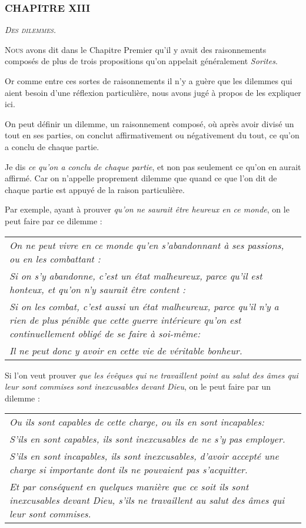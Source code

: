 \subsubsection{\centering \Large CHAPITRE XIII}
\begin{center}\emph{\large\scshape Des dilemmes.}\end{center}

	\lettrine{N}{ous} avons dit dans le Chapitre Premier qu'il y avait des raisonnements composés de plus de trois propositions qu'on appelait généralement \emph{Sorites}.

Or comme entre ces sortes de raisonnements il n'y a guère que les dilemmes qui aient besoin d'une réflexion particulière, nous avons jugé à propos de les expliquer ici.

On peut définir un dilemme, un raisonnement composé, où après avoir divisé un tout en ses parties, on conclut affirmativement ou négativement du tout, ce qu'on a conclu de chaque partie.

Je dis \emph{ce qu'on a conclu de chaque partie}, et non pas seulement ce qu'on en aurait affirmé. Car on n'appelle proprement dilemme que quand ce que l'on dit de chaque partie est appuyé de la raison particulière.

Par exemple, ayant à prouver \emph{qu'on ne saurait être heureux en ce monde}, on le peut faire par ce dilemme :

	\begin{tabularx}{\textwidth}{X}
		\emph{On ne peut vivre en ce monde qu'en s'abandonnant à ses passions, ou en les combattant :} \\
		\emph{Si on s'y abandonne, c'est un état malheureux, parce qu'il est honteux, et qu'on n'y saurait être content :} \\
		\emph{Si on les combat, c'est aussi un état malheureux, parce qu'il n'y a rien de plus pénible que cette guerre intérieure qu'on est continuellement obligé de se faire à soi-même:} \\
		\emph{Il ne peut donc y avoir en cette vie de véritable bonheur.} \\
	\end{tabularx}

Si l'on veut prouver \emph{que les évêques qui ne travaillent point au salut des âmes qui leur sont commises sont inexcusables devant Dieu}, on le peut faire par un dilemme :

	\begin{tabularx}{\textwidth}{X}
		\emph{Ou ils sont capables de cette charge, ou ils en sont incapables:} \\
		\emph{S'ils en sont capables, ils sont inexcusables de ne s'y pas employer.} \\
		\emph{S'ils en sont incapables, ils sont inexcusables, d'avoir accepté une charge si importante dont ils ne pouvaient pas s'acquitter.} \\
		\emph{Et par conséquent en quelques manière que ce soit ils sont inexcusables devant Dieu, s'ils ne travaillent au salut des âmes qui leur sont commises.} \\
	\end{tabularx}

